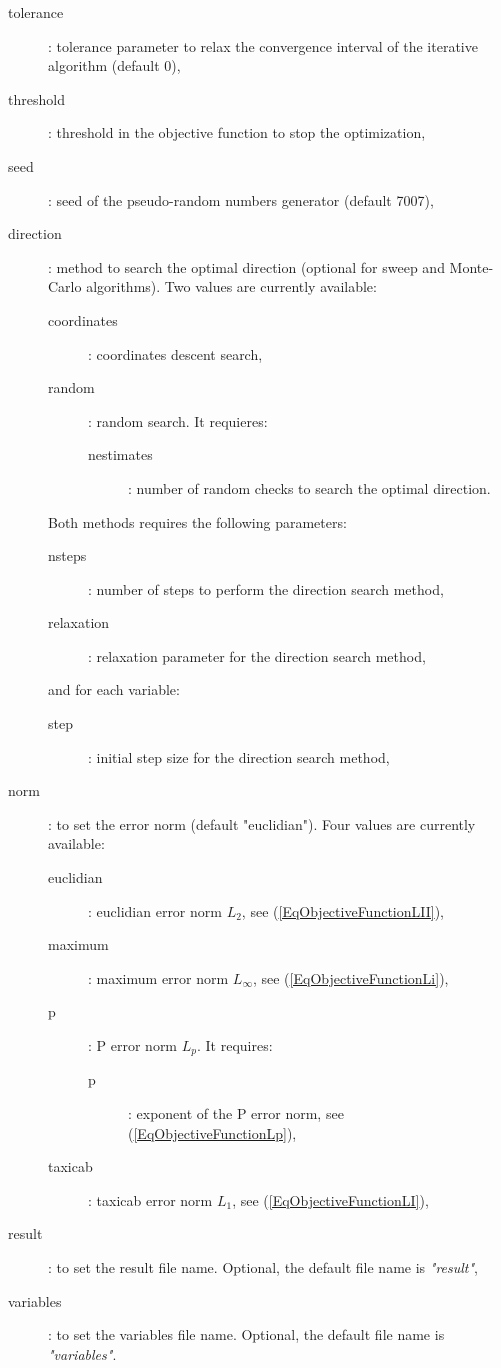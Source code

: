 \documentclass[a4paper]{report}
\begin{document}
\begin{description}
	\item[tolerance]: tolerance parameter to relax the convergence interval of
		the iterative algorithm (default 0),
	\item[threshold]: threshold in the objective function to stop the
		optimization,
	\item[seed]: seed of the pseudo-random numbers generator (default 7007),
	\item[direction]: method to search the optimal direction (optional for sweep
		and Monte-Carlo algorithms). Two values are currently available:
	\begin{description}
		\item[coordinates]: coordinates descent search,
		\item[random]: random search. It requieres:
		\begin{description}
			\item[nestimates]: number of random checks to search the optimal
				direction.
		\end{description}
	\end{description}
	Both methods requires the following parameters:
	\begin{description}
		\item[nsteps]: number of steps to perform the direction search method,
		\item[relaxation]: relaxation parameter for the direction search method,
	\end{description}
	and for each variable:
	\begin{description}
		\item[step]: initial step size for the direction search method,
	\end{description}
	\item[norm]: to set the error norm (default "euclidian"). Four values are
		currently available:
		\begin{description}
			\item[euclidian]: euclidian error norm $L_2$, see
				(\ref{EqObjectiveFunctionLII}),
			\item[maximum]: maximum error norm $L_\infty$, see
				(\ref{EqObjectiveFunctionLi}),
			\item[p]: P error norm $L_p$. It requires:
			\begin{description}
				\item[p]: exponent of the P error norm, see
					(\ref{EqObjectiveFunctionLp}),
			\end{description}
			\item[taxicab]: taxicab error norm $L_1$, see
				(\ref{EqObjectiveFunctionLI}),
		\end{description}
	\item[result]: to set the result file name. Optional, the default file name
		is \emph{"result"},
	\item[variables]: to set the variables file name. Optional, the default file
		name is \emph{"variables"}.
\end{description}
\end{document}
